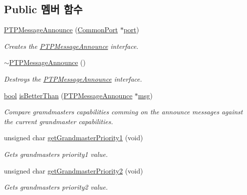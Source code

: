 \subsection*{Public 멤버 함수}
\begin{DoxyCompactItemize}
\item 
\hyperlink{class_p_t_p_message_announce_af0e7e6a6295101f339077c83ae7a5cba}{P\+T\+P\+Message\+Announce} (\hyperlink{class_common_port}{Common\+Port} $\ast$\hyperlink{gst__avb__playbin_8c_a63c89c04d1feae07ca35558055155ffb}{port})
\begin{DoxyCompactList}\small\item\em Creates the \hyperlink{class_p_t_p_message_announce}{P\+T\+P\+Message\+Announce} interface. \end{DoxyCompactList}\item 
\hyperlink{class_p_t_p_message_announce_a670819a3d9d9962302c8f45dcfc037e2}{$\sim$\+P\+T\+P\+Message\+Announce} ()
\begin{DoxyCompactList}\small\item\em Destroys the \hyperlink{class_p_t_p_message_announce}{P\+T\+P\+Message\+Announce} interface. \end{DoxyCompactList}\item 
\hyperlink{avb__gptp_8h_af6a258d8f3ee5206d682d799316314b1}{bool} \hyperlink{class_p_t_p_message_announce_a3bf4e41c1ccf46f20b2330330bd69630}{is\+Better\+Than} (\hyperlink{class_p_t_p_message_announce}{P\+T\+P\+Message\+Announce} $\ast$\hyperlink{openavb__log_8c_a0c7e58a50354c4a4d6dad428d0e47029}{msg})
\begin{DoxyCompactList}\small\item\em Compare gramdmaster\textquotesingle{}s capabilities comming on the announce messages against the current grandmaster capabilities. \end{DoxyCompactList}\item 
unsigned char \hyperlink{class_p_t_p_message_announce_a78151d3c07bb5d72555b8aec6d765f88}{get\+Grandmaster\+Priority1} (void)
\begin{DoxyCompactList}\small\item\em Gets grandmaster\textquotesingle{}s priority1 value. \end{DoxyCompactList}\item 
unsigned char \hyperlink{class_p_t_p_message_announce_a7bd53c122e2026948da666611d2529b9}{get\+Grandmaster\+Priority2} (void)
\begin{DoxyCompactList}\small\item\em Gets grandmaster\textquotesingle{}s priority2 value. \end{DoxyCompactList}\item 

\end{DoxyCompactItemize}
